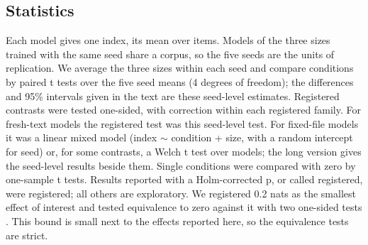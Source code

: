 \subsection{Statistics}
Each model gives one index, its mean over items. Models of the three sizes trained with the same seed share a corpus, so the five seeds are the units of replication. We average the three sizes within each seed and compare conditions by paired t tests over the five seed means (4 degrees of freedom); the differences and 95\% intervals given in the text are these seed-level estimates. Registered contrasts were tested one-sided, with \citet{holm1979} correction within each registered family. For fresh-text models the registered test was this seed-level test. For fixed-file models it was a linear mixed model (index $\sim$ condition + size, with a random intercept for seed) or, for some contrasts, a Welch t test over models; the long version gives the seed-level results beside them. Single conditions were compared with zero by one-sample t tests. Results reported with a Holm-corrected p, or called registered, were registered; all others are exploratory. We registered 0.2 nats as the smallest effect of interest and tested equivalence to zero against it with two one-sided tests \cite{lakens2017}. This bound is small next to the effects reported here, so the equivalence tests are strict.
